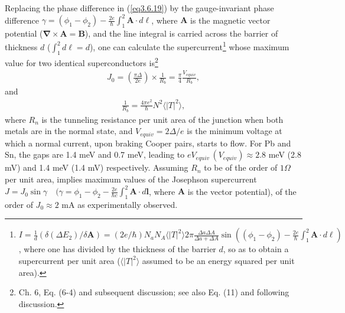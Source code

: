 Replacing the phase difference in (\ref{eq3.6.19}) by the gauge-invariant phase difference $\gamma=(\phi_1-\phi_2)-\frac{2e}{\hbar}\int_1^2\mathbf A\cdot d\pmb \ell$, where $\mathbf A$ is the magnetic vector potential ($\pmb\nabla\times\mathbf A=\mathbf B$), and the line integral is carried across the barrier of thickness $d$ ($\int_1^2d\ell=d$), one can calculate the supercurrent\footnote{$I=\frac{1}{d}\left(\delta(\Delta E_2)/\delta\mathbf A\right)=\left(2e/\hbar\right)N_aN_A\langle|T|^2\rangle2\pi\frac{\Delta a\Delta A}{\Delta a+\Delta A}\sin\left((\phi_1-\phi_2)-\frac{2e}{\hbar}\int_1^2\mathbf A\cdot d\pmb \ell\right)$, where one has divided by the thickness of the barrier $d$, so as to obtain a supercurrent per unit area ($\langle|T|^2\rangle$ assumed to be an energy squared per unit area).} whose maximum value for two identical superconductors is\footnote{\cite{Tinkham:96} Ch. 6, Eq. (6-4) and subsequent discussion; see also \cite{Anderson:64} Eq. (11) and following discussion.}
\begin{align}\label{eq4.7.20}
J_0=\left(\frac{\pi\Delta}{2e}\right)\times\frac{1}{R_b}=\frac{\pi}{4}\frac{V_{equiv}}{R_b},
\end{align}
and
\begin{align}\label{eq4.7.21}
\frac{1}{R_b}=\frac{4\pi e^2}{\hbar}N^2\langle|T|^2\rangle,
\end{align}
 where $R_n$ is the tunneling resistance per unit area of the junction when both metals are in the normal state, and $V_{equiv}=2\Delta/e$ is the minimum voltage at which a normal current, upon braking Cooper pairs, starts to flow. For Pb and Sn, the gaps are 1.4 meV and 0.7 meV, leading to $e V_{equiv} \,(V_{equiv})\approx 2.8$ meV (2.8 mV) and 1.4 meV (1.4 mV) respectively. Assuming $R_n$ to be of the order of $1\Omega$ per unit area, implies maximum values of the Josephson supercurrent $J=J_0\sin\gamma\quad(\gamma=\phi_1-\phi_2-\frac{2e}{\hbar c}\int^2_1\mathbf A\cdot d\mathbf l$, where $\mathbf A$ is the vector potential), of the order of $J_0\approx 2$ mA as experimentally observed.
 
